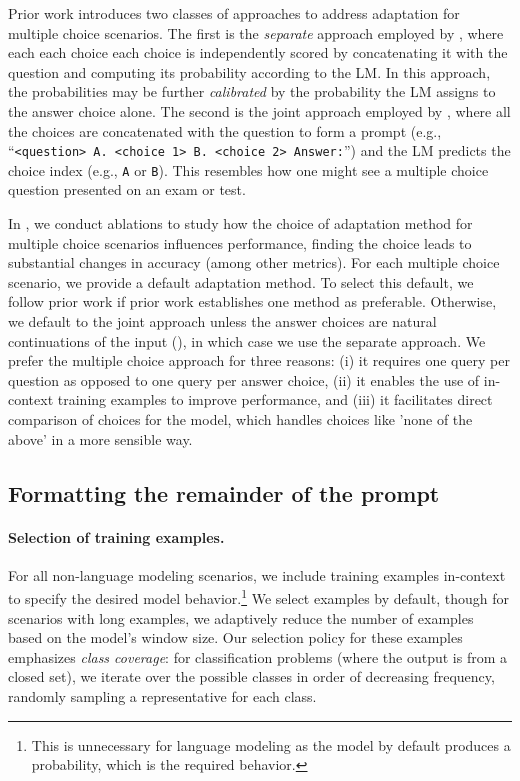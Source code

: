 Prior work introduces two classes of approaches to address adaptation for multiple choice scenarios.
The first is the \textit{separate} approach employed by \citet{brown2020gpt3}, where each each choice each choice is independently scored by concatenating it with the question and computing its probability according to the LM.
In this approach, the probabilities may be further \textit{calibrated} by the probability the LM assigns to the answer choice alone.
The second is the joint approach employed by \citet{hendrycks2021measuring}, where all the choices are concatenated with the question to form a prompt (e.g., ``\texttt{<question> A.\,<choice\,1> B.\,<choice\,2>  Answer:}'') and the LM predicts the choice index (e.g., \texttt{A} or \texttt{B}).
This resembles how one might see a multiple choice question presented on an exam or test.

In , we conduct ablations to study how the choice of adaptation method for multiple choice scenarios influences performance, finding the choice leads to substantial changes in accuracy (among other metrics).
For each multiple choice scenario, we provide a default adaptation method.
To select this default, we follow prior work if prior work establishes one method as preferable.
Otherwise, we default to the joint approach unless the answer choices are natural continuations of the input (\eg \hellaswag), in which case we use the separate approach.
We prefer the multiple choice approach for three reasons: (i) it requires one query per question as opposed to one query per answer choice, (ii) it enables the use of in-context training examples to improve performance, and (iii) it facilitates direct comparison of choices for the model, which handles choices like 'none of the above' in a more sensible way.

\subsection{Formatting the remainder of the prompt}
\label{sec:prompting-remainder}

\paragraph{Selection of training examples.}
For all non-language modeling scenarios, we include training examples in-context to specify the desired model behavior.\footnote{This is unnecessary for language modeling as the model by default produces a probability, which is the required behavior.}
We select \numincontext examples by default, though for scenarios with long examples, we adaptively reduce the number of  examples based on the model's window size.
Our selection policy for these examples emphasizes \textit{class coverage}: for classification problems (\ie where the output is from a closed set), we iterate over the possible classes in order of decreasing frequency, randomly sampling a representative for each class.

